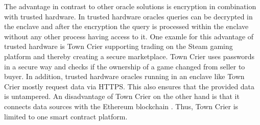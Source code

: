 \documentclass[conference]{IEEEtran}
\begin{document}
The advantage in contrast to other oracle solutions is encryption in combination with trusted hardware. In trusted hardware oracles queries can be decrypted in the enclave and after the encryption the query is processed within the enclave without any other process having access to it. One examle for this advantage of trusted hardware is Town Crier supporting trading on the Steam gaming platform and thereby creating a secure marketplace. Town Crier uses passwords in a secure way and checks if the ownership of a game changed from seller to buyer. In addition, trusted hardware oracles running in an enclave like Town Crier mostly request data via HTTPS. This also ensures that the provided data is untampered. \cite{Ellis2017} An disadvantage of Town Crier on the other hand is that it connects data sources with the Ethereum blockchain \cite{Zhang2016}. Thus, Town Crier is limited to one smart contract platform.
%
%

\end{document}
